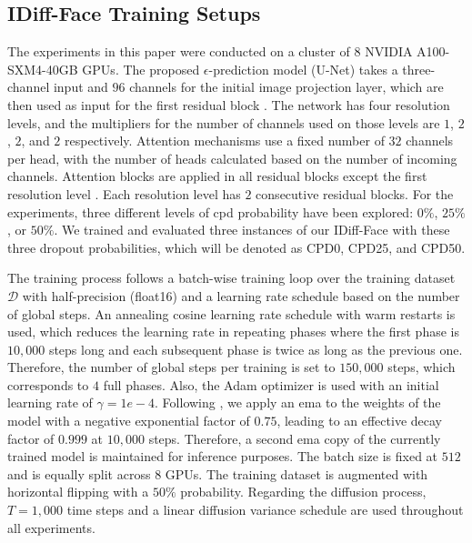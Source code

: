 \documentclass[10pt,twocolumn,letterpaper]{article}
\newcommand{\cacpdzeroshortwithoutspace}{CPD0}
\newcommand{\cacpdtwentyfiveshortwithoutspace}{CPD25}
\newcommand{\cacpdfiftyshortwithoutspace}{CPD50}
\newcommand{\approachname}{IDiff-Face }
\begin{document}
\vspace{-2mm}
\subsection{\approachname Training Setups}
\vspace{-1mm}
The experiments in this paper were conducted on a cluster of $8$ NVIDIA A100-SXM4-40GB GPUs. The proposed $\epsilon$-prediction model (U-Net) \cite{Rombach2021} takes a three-channel input and $96$ channels for the initial image projection layer, which are then used as input for the first residual block \cite{ResNet}. The network has four resolution levels, and the multipliers for the number of channels used on those levels are $1$, $2$, $2$, and $2$ respectively. Attention mechanisms use a fixed number of $32$ channels per head, with the number of heads calculated based on the number of incoming channels. Attention blocks are applied in all residual blocks except the first resolution level \cite{Rombach2021}. Each resolution level has $2$ consecutive residual blocks. For the experiments, three different levels of \acrshort{cpd} probability have been explored: $0\%$, $25\%$, or $50\%$. We trained and evaluated three instances of our \approachname with these three dropout probabilities, which will be denoted as \cacpdzeroshortwithoutspace, \cacpdtwentyfiveshortwithoutspace, and \cacpdfiftyshortwithoutspace.

The training process follows a batch-wise training loop over the training dataset $\mathcal{D}$ with half-precision (float16) and a learning rate schedule based on the number of global steps. An annealing cosine learning rate schedule with warm restarts \cite{CosineAnnealing} is used, which reduces the learning rate in repeating phases where the first phase is $10{,}000$ steps long and each subsequent phase is twice as long as the previous one. Therefore, the number of global steps per training is set to $150{,}000$ steps, which corresponds to $4$ full phases. Also, the Adam optimizer \cite{AdamOptimizer} is used with an initial learning rate of $\gamma=1e-4$. Following \cite{Ho2020, Rombach2021}, we apply an \acrshort{ema} to the weights of the model with a negative exponential factor of $0.75$, leading to an effective decay factor of $0.999$ at $10{,}000$ steps. Therefore, a second \acrshort{ema} copy of the currently trained model is maintained for inference purposes. The batch size is fixed at $512$ and is equally split across $8$ GPUs. 
The training dataset is augmented with horizontal flipping with a $50\%$ probability.
Regarding the diffusion process, $T=1{,}000$ time steps and a linear diffusion variance schedule are used throughout all experiments.
\end{document}
